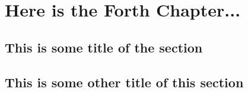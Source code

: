 \chapter{Here is the Forth Chapter...}

\blindtext 


\section{This is some title of the section}

\blindtext 

\blindtext 



\section{This is some other  title of this section}

\blindtext 

\blindtext 